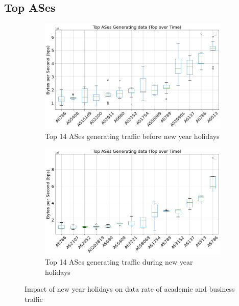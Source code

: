 \documentclass[10pt, journal, letterpaper]{IEEEtran}
\newcommand\linearFigSze{0.48}
\begin{document}
\subsection{Top ASes}
\begin{figure}
    \begin{subfigure}{\linearFigSze\textwidth}
          \centering
          \includegraphics[width=\columnwidth]{img/BCH2_top14AS_generating_bps.png}
          \caption{Top 14 ASes generating traffic before new year holidays}
          \label{fig:BCH2_topAS_gen_bps}
    \end{subfigure}
    \begin{subfigure}{\linearFigSze\textwidth}
          \centering
          \includegraphics[width=\columnwidth]{img/CH2_top14AS_generating_bps.png}
          \caption{Top 14 ASes generating traffic during new year holidays}
          \label{fig:CH2_topAS_gen_bps}
    \end{subfigure}
    \caption{Impact of new year holidays on data rate of academic and business traffic}
    \label{fig:topAS_gen_BCH_CH}
\end{figure}
\end{document}

